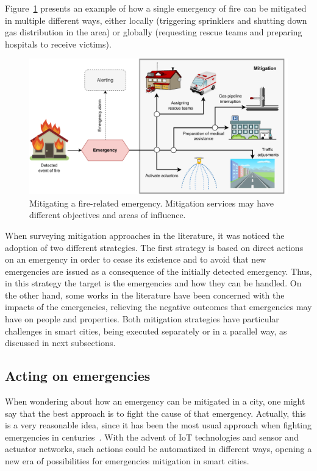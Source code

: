 \begin{refsection}
Figure~\ref{Fig:mitigation} presents an example of how a single emergency of fire can be mitigated in multiple different ways, either locally (triggering sprinklers and shutting down gas distribution in the area) or globally (requesting rescue teams and preparing hospitals to receive victims).

\begin{figure}[ht]
  \centering
  \includegraphics[scale=0.45]{Chapters/1-Survey/images/mitigation.pdf}
  \caption{Mitigating a fire-related emergency. Mitigation services may have different objectives and areas of influence.}\label{Fig:mitigation}
\end{figure}

When surveying mitigation approaches in the literature, it was noticed the adoption of two different strategies. The first strategy is based on direct actions on an emergency in order to cease its existence and to avoid that new emergencies are issued as a consequence of the initially detected emergency. Thus, in this strategy the target is the emergencies and how they can be handled. On the other hand, some works in the literature have been concerned with the impacts of the emergencies, relieving the negative outcomes that emergencies may have on people and properties. Both mitigation strategies have particular challenges in smart cities, being executed separately or in a parallel way, as discussed in next subsections. 

\subsection{Acting on emergencies}

When wondering about how an emergency can be mitigated in a city, one might say that the best approach is to fight the cause of that emergency. Actually, this is a very reasonable idea, since it has been the most usual approach when fighting emergencies in centuries~\cite{fireevolution,firetemporaldata1}. With the advent of IoT technologies and sensor and actuator networks, such actions could be automatized in different ways, opening a new era of possibilities for emergencies mitigation in smart cities. 


\end{refsection}
